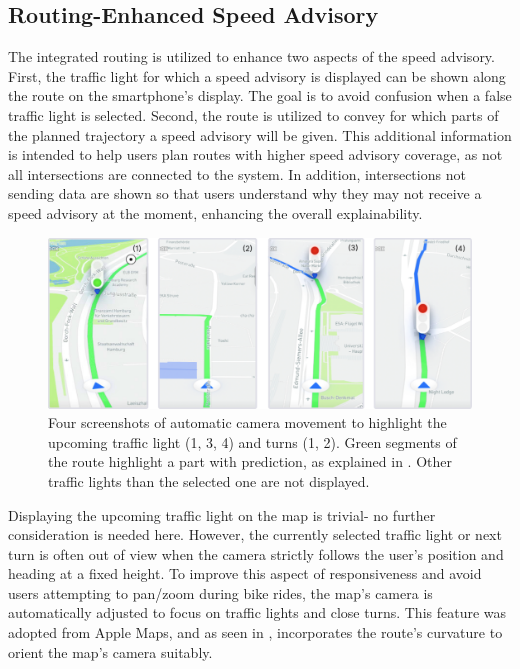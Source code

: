 \subsection{Routing-Enhanced Speed Advisory}

The integrated routing is utilized to enhance two aspects of the speed advisory. First, the traffic light for which a speed advisory is displayed can be shown along the route on the smartphone's display. The goal is to avoid confusion when a false traffic light is selected. Second, the route is utilized to convey for which parts of the planned trajectory a speed advisory will be given. This additional information is intended to help users plan routes with higher speed advisory coverage, as not all intersections are connected to the system. In addition, intersections not sending data are shown so that users understand why they may not receive a speed advisory at the moment, enhancing the overall explainability.

\begin{figure}[t]
\centering
\includegraphics[width=\linewidth]{images/camera-controller.pdf}
\caption{Four screenshots of automatic camera movement to highlight the upcoming traffic light (1, 3, 4) and turns (1, 2). Green segments of the route highlight a part with prediction, as explained in . Other traffic lights than the selected one are not displayed.}
\label{fig:camera-controller}
\end{figure}

Displaying the upcoming traffic light on the map is trivial- no further consideration is needed here. However, the currently selected traffic light or next turn is often out of view when the camera strictly follows the user's position and heading at a fixed height. To improve this aspect of responsiveness and avoid users attempting to pan/zoom during bike rides, the map's camera is automatically adjusted to focus on traffic lights and close turns. This feature was adopted from Apple Maps, and as seen in , incorporates the route's curvature to orient the map's camera suitably.

